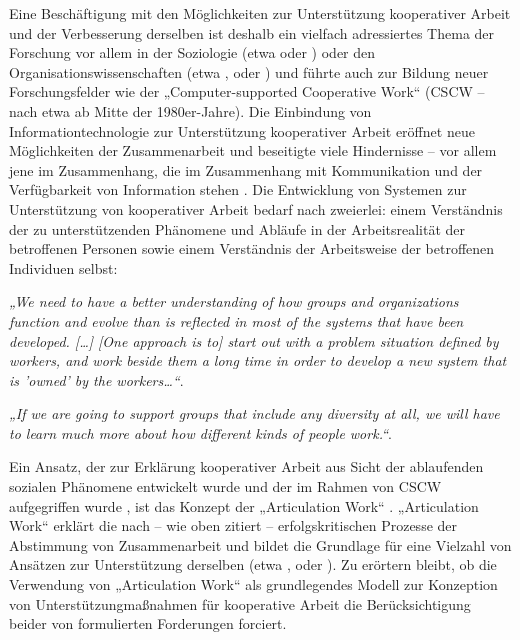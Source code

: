 Eine Beschäftigung mit den Möglichkeiten zur Unterstützung kooperativer Arbeit und der Verbesserung derselben ist deshalb ein vielfach adressiertes Thema der Forschung vor allem in der Soziologie (etwa \citet{Strauss93} oder \citet{Suchman95}) oder den Organisationswissenschaften (etwa \citet{Argyris78}, \citet{Kim93} oder \citet{Firestone03a}) und führte auch zur Bildung neuer Forschungsfelder wie der „Computer-supported Cooperative Work“ (CSCW -- nach \citet{Grudin94} etwa ab Mitte der 1980er-Jahre). Die Einbindung von Informationtechnologie zur Unterstützung kooperativer Arbeit eröffnet neue Möglichkeiten der Zusammenarbeit und beseitigte viele Hindernisse -- vor allem jene im Zusammenhang, die im Zusammenhang mit Kommunikation und der Verfügbarkeit von Information stehen \citep{Grudin88}. Die Entwicklung von Systemen zur Unterstützung von kooperativer Arbeit bedarf nach \citep{Grudin88} zweierlei: einem Verständnis der zu unterstützenden Phänomene und Abläufe in der Arbeitsrealität der betroffenen Personen sowie einem Verständnis der Arbeitsweise der betroffenen Individuen selbst: 

\emph{„We need to have a better understanding of how groups and organizations function and evolve than is reflected in most of the systems that have been developed. [\ldots] [One approach is to] start out with a problem situation defined by workers, and work beside them a long time in order to develop a new system that is 'owned' by the workers\ldots“}\citep[][S.90]{Grudin88}. 

\emph{„If we are going to support groups that include any diversity at all, we will have to learn much more about how different kinds of people work.“}\citep[][S.91]{Grudin88}.

Ein Ansatz, der zur Erklärung kooperativer Arbeit aus Sicht der ablaufenden sozialen Phänomene entwickelt wurde und der im Rahmen von CSCW aufgegriffen wurde \cite{Schmidt92}, ist das Konzept der „Articulation Work“ \citet{Strauss85}. „Articulation Work“ erklärt die nach \citet{Roy01} -- wie oben zitiert -- erfolgskritischen Prozesse der Abstimmung von Zusammenarbeit und bildet die Grundlage für eine Vielzahl von Ansätzen zur Unterstützung derselben (etwa \citep{Cabitza06}, \cite{Raposo04} oder \cite{Davenport02}). Zu erörtern bleibt, ob die Verwendung von „Articulation Work“ als grundlegendes Modell zur Konzeption von Unterstützungmaßnahmen für kooperative Arbeit die Berücksichtigung beider von \citet{Grudin88} formulierten Forderungen forciert.

